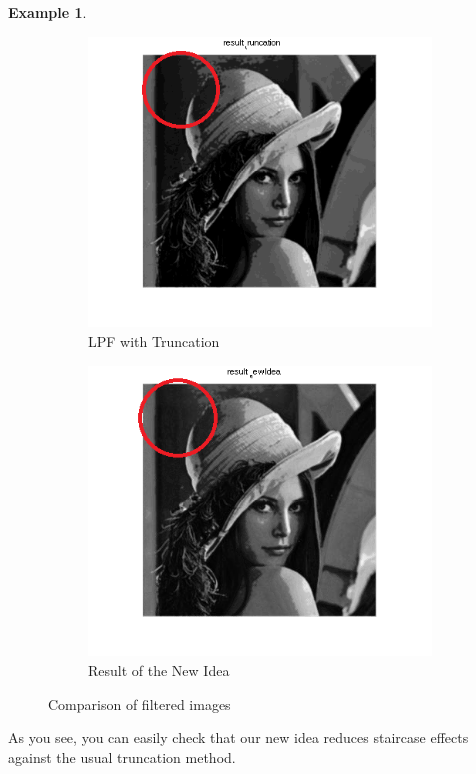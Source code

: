 \documentclass[12pt]{amsart}
\theoremstyle{definition}
\newtheorem{ex}[thm]{Example}
\theoremstyle{remark}
\numberwithin{thm}{section}
\begin{document}
\begin{ex}
\begin{figure}[h]
\begin{subfigure}[b]{0.3\textwidth} \includegraphics[width=\textwidth]{truncation.png} \caption{LPF with Truncation} \label{fig:LPF with Truncation} \end{subfigure}
\begin{subfigure}[b]{0.3\textwidth} \includegraphics[width=\textwidth]{new.png} \caption{Result of the New Idea} \label{fig:new} \end{subfigure}
\caption{Comparison of filtered images}\label{fig:comp} 
\end{figure}

As you see, you can easily check that our new idea reduces staircase effects against the usual truncation method.
\end{ex}
\end{document}
